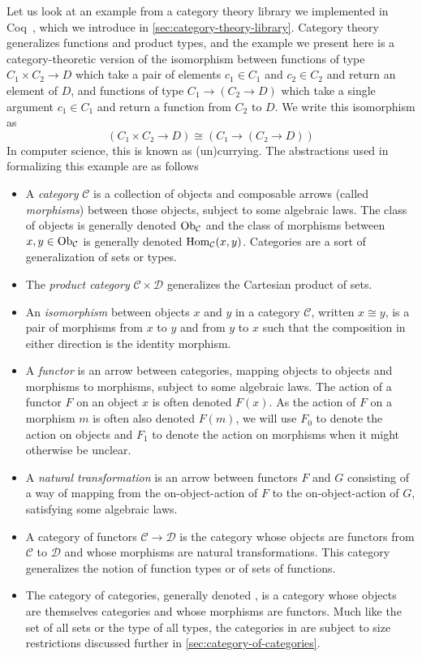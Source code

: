 Let us look at an example from a category theory library we implemented in Coq~\cite{category-coq-experience}, which we introduce in \autoref{sec:category-theory-library}.
Category theory generalizes functions and product types, and the example we present here is a category-theoretic version of the isomorphism between functions of type $C_1 \times C_2 \to D$ which take a pair of elements $c_1 \in C_1$ and $c_2 \in C_2$ and return an element of $D$, and functions of type $C_1 \to (C_2 \to D)$ which take a single argument $c_1 \in C_1$ and return a function from $C_2$ to $D$.
We write this isomorphism as
\[
(C₁ × C₂ → D) ≅ (C₁ → (C₂ → D))
\]
In computer science, this is known as (un)currying.
The abstractions used in formalizing this example are as follows
\begin{itemize}
\item
  A \emph{category} $\mathcal C$ is a collection of objects and composable arrows (called \emph{morphisms}) between those objects, subject to some algebraic laws.
  The class of objects is generally denoted $\Ob[\mathcal C]$ and the class of morphisms between $x, y\in \Ob[\mathcal C]$ is generally denoted $\Hom[\mathcal C](x, y)$.
  Categories are a sort of generalization of sets or types.
\item
  The \emph{product category} $\mathcal C \times \mathcal D$ generalizes the Cartesian product of sets.
\item
  An \emph{isomorphism} between objects $x$ and $y$ in a category $\mathcal C$, written $x \cong y$, is a pair of morphisms from $x$ to $y$ and from $y$ to $x$ such that the composition in either direction is the identity morphism.
\item
  A \emph{functor} is an arrow between categories, mapping objects to objects and morphisms to morphisms, subject to some algebraic laws.
  The action of a functor $F$ on an object $x$ is often denoted $F(x)$.
  As the action of $F$ on a morphism $m$ is often also denoted $F(m)$, we will use $F_0$ to denote the action on objects and $F_1$ to denote the action on morphisms when it might otherwise be unclear.
\item
  A \emph{natural transformation} is an arrow between functors $F$ and $G$ consisting of a way of mapping from the on-object-action of $F$ to the on-object-action of $G$, satisfying some algebraic laws.
\item
  A category of functors $\mathcal C \to \mathcal D$ is the category whose objects are functors from $\mathcal C$ to $\mathcal D$ and whose morphisms are natural transformations.
  This category generalizes the notion of function types or of sets of functions.
\item
  The category of categories, generally denoted \Cat, is a category whose objects are themselves categories and whose morphisms are functors.
  Much like the set of all sets or the type of all types, the categories in \Cat\space are subject to size restrictions discussed further in \autoref{sec:category-of-categories}.
\end{itemize}
